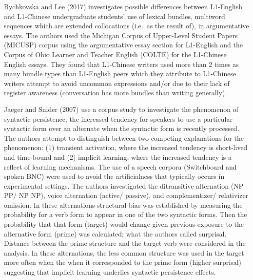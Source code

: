 \documentclass[
  letterpaper,
]{latex/krantz}
\begin{document}
\begin{tcolorbox}[enhanced jigsaw, opacitybacktitle=0.6, breakable, colframe=quarto-callout-caution-color-frame, arc=.35mm, left=2mm, leftrule=.75mm, title=\textcolor{quarto-callout-caution-color}{\faFire}\hspace{0.5em}{Case study}, opacityback=0, colback=white, toptitle=1mm, rightrule=.15mm, titlerule=0mm, bottomtitle=1mm, bottomrule=.15mm, coltitle=black, colbacktitle=quarto-callout-caution-color!10!white, toprule=.15mm]
Bychkovska and Lee (2017) investigates possible differences between
L1-English and L1-Chinese undergraduate students' use of lexical
bundles, multiword sequences which are extended collocations (i.e.~as
the result of), in argumentative essays. The authors used the Michigan
Corpus of Upper-Level Student Papers (MICUSP) corpus using the
argumentative essay section for L1-English and the Corpus of Ohio
Learner and Teacher English (COLTE) for the L1-Chinese English essays.
They found that L1-Chinese writers used more than 2 times as many bundle
types than L1-English peers which they attribute to L1-Chinese writers
attempt to avoid uncommon expressions and/or due to their lack of
register awareness (conversation has more bundles than writing
generally).
\end{tcolorbox}

\begin{tcolorbox}[enhanced jigsaw, opacitybacktitle=0.6, breakable, colframe=quarto-callout-caution-color-frame, arc=.35mm, left=2mm, leftrule=.75mm, title=\textcolor{quarto-callout-caution-color}{\faFire}\hspace{0.5em}{Case study}, opacityback=0, colback=white, toptitle=1mm, rightrule=.15mm, titlerule=0mm, bottomtitle=1mm, bottomrule=.15mm, coltitle=black, colbacktitle=quarto-callout-caution-color!10!white, toprule=.15mm]
Jaeger and Snider (2007) use a corpus study to investigate the
phenomenon of syntactic persistence, the increased tendency for speakers
to use a particular syntactic form over an alternate when the syntactic
form is recently processed. The authors attempt to distinguish between
two competing explanations for the phenomenon: (1) transient activation,
where the increased tendency is short-lived and time-bound and (2)
implicit learning, where the increased tendency is a reflect of learning
mechanisms. The use of a speech corpora (Switchboard and spoken BNC)
were used to avoid the artificialness that typically occurs in
experimental settings. The authors investigated the ditransitive
alternation (NP PP/ NP NP), voice alternation (active/ passive), and
complementizer/ relativizer omission. In these alternations structural
bias was established by measuring the probability for a verb form to
appear in one of the two syntactic forms. Then the probability that that
form (target) would change given previous exposure to the alternative
form (prime) was calculated; what the authors called surprisal. Distance
between the prime structure and the target verb were considered in the
analysis. In these alternations, the less common structure was used in
the target more often when the when it corresponded to the prime form
(higher surprisal) suggesting that implicit learning underlies syntactic
persistence effects.
\end{tcolorbox}
\end{document}
